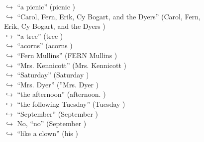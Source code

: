 \documentclass[11pt,a4paper, onecolumn]{article}
\begin{document}
\begin{figure}[t] \small \begin{tcolorbox}[boxsep=0pt,left=5pt,right=0pt,top=2pt,colback = yellow!5] \begin{dialogue}
 \small 
\colorbox{pink!25}{$\hookrightarrow$}
{ ``a picnic'' (picnic ) }
\\
\colorbox{pink!25}{$\hookrightarrow$}
{ ``Carol, Fern, Erik, Cy Bogart, and the Dyers'' (Carol, Fern, Erik, Cy Bogart, and the Dyers ) }
\\
\colorbox{pink!25}{$\hookrightarrow$}
{ ``a tree'' (tree ) }
\\
\colorbox{pink!25}{$\hookrightarrow$}
{ ``acorns'' (acorns ) }
\\
\colorbox{pink!25}{$\hookrightarrow$}
{ ``Fern Mullins'' (FERN Mullins ) }
\\
\colorbox{pink!25}{$\hookrightarrow$}
{ ``Mrs. Kennicott'' (Mrs. Kennicott ) }
\\
\colorbox{pink!25}{$\hookrightarrow$}
{ ``Saturday'' (Saturday ) }
\\
\colorbox{pink!25}{$\hookrightarrow$}
{ ``Mrs. Dyer'' (''Mrs. Dyer ) }
\\
\colorbox{pink!25}{$\hookrightarrow$}
{ ``the afternoon'' (afternoon. ) }
\\
\colorbox{pink!25}{$\hookrightarrow$}
{ ``the following Tuesday'' (Tuesday ) }
\\
\colorbox{pink!25}{$\hookrightarrow$}
{ ``September'' (September ) }
\\
\colorbox{pink!25}{$\hookrightarrow$}
\colorbox{red!25}{No,}
{ ``no'' (September ) }
\\
\colorbox{pink!25}{$\hookrightarrow$}
{ ``like a clown'' (his ) }
\\

\end{dialogue}
\end{tcolorbox}
\end{figure}
\end{document}
